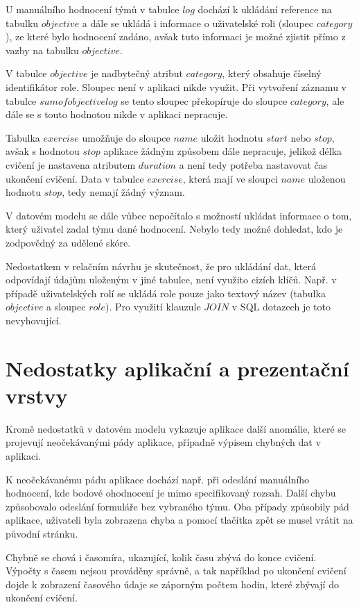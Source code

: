\documentclass[
  digital,
  twoside,
  table, 
  nolof, 
  nolot
]{fithesis3}
\begin{document}
U manuálního hodnocení týmů v tabulce $log$ dochází k ukládání reference na tabulku $objective$ a dále se ukládá i informace o uživatelské roli (sloupec $category$), ze které bylo hodnocení zadáno, avšak tuto informaci je možné zjistit přímo z vazby na tabulku $objective$.

V tabulce $objective$ je nadbytečný atribut $category$, který obsahuje číselný identifikátor role. Sloupec není v aplikaci nikde využit. Při vytvoření záznamu v tabulce $sumofobjectivelog$ se tento sloupec překopíruje do sloupce $category$, ale dále se s touto hodnotou nikde v aplikaci nepracuje.

Tabulka $exercise$ umožňuje do sloupce $name$ uložit hodnotu $start$ nebo $stop$, avšak s hodnotou $stop$ aplikace žádným způsobem dále nepracuje, jelikož délka cvičení je nastavena atributem $duration$ a není tedy potřeba nastavovat čas ukončení cvičení. Data v tabulce $exercise$, která mají ve sloupci $name$ uloženou hodnotu $stop$, tedy nemají žádný význam.

V datovém modelu se dále vůbec nepočítalo s možností ukládat informace o tom, který uživatel zadal týmu dané hodnocení. Nebylo tedy možné dohledat, kdo je zodpovědný za udělené skóre.

Nedostatkem v relačním návrhu je skutečnost, že pro ukládání dat, která odpovídají údajům uloženým v jiné tabulce, není využito cizích klíčů. Např. v případě uživatelských rolí se ukládá role pouze jako textový název (tabulka $objective$ a sloupec $role$). Pro využití klauzule $JOIN$ v SQL dotazech je toto nevyhovující.

\section{Nedostatky aplikační a prezentační vrstvy}

Kromě nedostatků v datovém modelu vykazuje aplikace další anomálie, které se projevují neočekávanými pády aplikace, případně výpisem chybných dat v aplikaci.

K neočekávanému pádu aplikace dochází např. při odeslání manuálního hodnocení, kde bodové ohodnocení je mimo specifikovaný rozsah. Další chybu způsobovalo odeslání formuláře bez vybraného týmu. Oba případy způsobily pád aplikace, uživateli byla zobrazena chyba a pomocí tlačítka zpět se musel vrátit na původní stránku.

Chybně se chová i časomíra, ukazující, kolik času zbývá do konce cvičení. Výpočty s časem nejsou prováděny správně, a tak například po ukončení cvičení dojde k zobrazení časového údaje se záporným počtem hodin, které zbývají do ukončení cvičení.
\end{document}
